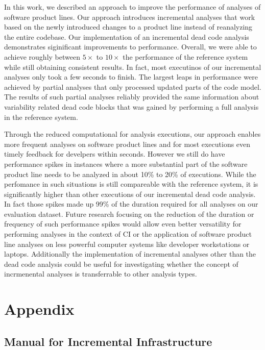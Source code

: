 \documentclass[a4paper]{article}
\begin{document}
In this work, we described an approach to improve the performance of analyses of software product lines. Our approach introduces incremental analyses that work based on the newly introduced changes to a product line instead of reanalyzing the entire codebase. Our implementation of an incremental dead code analysis demonstrates siginificant improvements to performance. Overall, we were able to achieve roughly between $5\times$ to $10\times$ the performance of the reference system while still obtaining consistent results. 
In fact, most executinos of our incremental analyses only took a few seconds to finish. The largest leaps in performance were achieved by partial analyses that only processed updated parts of the code model. The results of such partial analyses reliably provided the same information about variability related dead code blocks that was gained by performing a full analysis in the reference system.

Through the reduced computational for analysis executions, our approach enables more frequent analyses on software product lines and for most executions even timely feedback for develpers within seconds. However we still do have performance spikes in instances where a more substantial part of the software product line needs to be analyzed in about 10\% to 20\% of executions. While the perfomance in such situations is still compareable with the reference system, it is significantly higher than other executions of our incremental dead code analysis. In fact those spikes made up 99\% of the duration required for all analyses on our evaluation dataset. Future research focusing on the reduction of the duration or frequency of such performance spikes would allow even better versatility for performing analyses in the context of CI or the application of software product line analyses on less powerful computer systems like developer workstations or laptops.
Additionally the implementation of incremental analyses other than the dead code analysis could be useful for investigating whether the concept of incrmenental analyses is transferrable to other analysis types.

\clearpage
\newpage



\clearpage
\newpage
\appendix
\section{Appendix}
\subsection{Manual for Incremental Infrastructure}
\end{document}
